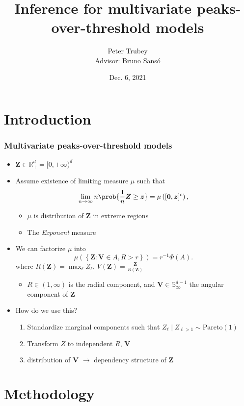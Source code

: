 \documentclass[aspectratio=169]{beamer}
\title{Inference for multivariate peaks-over-threshold models}
\author{Peter Trubey \\ Advisor: Bruno Sans{\'o}}
\institute{UCSC - Statistics Department}
\date[12/6/2021]{Dec. 6, 2021}
\begin{document}
\begin{frame}[plain]
  \titlepage
\end{frame}

\section{Introduction}
\begin{frame}
  \frametitle{Multivariate peaks-over-threshold models}
  \begin{itemize}
    \item $\bm{Z} \in {\mathbb R}^d_+ = [0,+\infty)^d$\,
    \item Assume existence of limiting measure $\mu$ such that
      \[
        \lim\limits_{n\to\infty}n\prob{\frac{1}{n}\bm{Z}\geq \bm{z}} =
         \mu\left([\bm{0},\bm{z}]^c\right),
      \]
      \begin{itemize}
        \item $\mu$ is distribution of $\bm{Z}$ in extreme regions
        \item The \emph{Exponent} measure
      \end{itemize}
    \pause
    \item We can factorize $\mu$ into
      \[
        \mu\left( \left\lbrace\bm{Z} : \bm{V} \in A , R > r\right\rbrace \right) =
         r^{-1}\Phi(A).
      \]
      where $R(\bm{Z}) = \max_{\ell}Z_{\ell}$, $V(\bm{Z}) = \frac{\bm{Z}}{R(\bm{Z})}$
      \begin{itemize}
        \item $R \in (1,\infty)$ is the radial component, and
        $\bm{V} \in {\mathbb S}_{\infty}^{d-1}$ the angular component of $\bm{Z}$
      \end{itemize}
    \pause
    \item How do we use this?
      \begin{enumerate}
        \item Standardize marginal components such that $Z_{\ell}\mid Z_{\ell > 1} \sim \text{Pareto}(1)$
        \item Transform $Z$ to independent $R$, $\bm{V}$
        \item distribution of $\bm{V}$ $\longrightarrow$  dependency structure of $\bm{Z}$
      \end{enumerate}
  \end{itemize}
\end{frame}

\section{Methodology}
\end{document}
